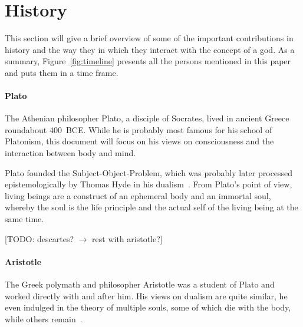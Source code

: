 \section{History}
\label{sec:History}

\begin{figure*}
    \caption[The Timeline]{Timeline of the presented persons. Those grayed out are left as a reference for other mentions in this document~\cite{wikimedia2021}. Rounded rectangles ( and ) denote the full life span of the respective person.}
    \label{fig:timeline}
\end{figure*}

This section will give a brief overview of some of the important contributions in history and the way they in which they interact with the concept of a god.
As a summary, Figure~\ref{fig:timeline} presents all the persons mentioned in this paper and puts them in a time frame.

\paragraph{Plato}
The Athenian philosopher Plato, a disciple of Socrates, lived in ancient Greece roundabout 400~BCE.
While he is probably most famous for his school of Platonism, this document will focus on his views on consciousness and the interaction between body and mind.

Plato founded the Subject-Object-Problem, which was probably later processed epistemologically by Thomas Hyde in his dualism~\cite{plato360}.
From Plato's point of view, living beings are a construct of an ephemeral body and an immortal soul, whereby the soul is the life principle and the actual self of the living being at the same time.

[TODO: descartes? $\to$ rest with aristotle?]

\paragraph{Aristotle}
The Greek polymath and philosopher Aristotle was a student of Plato and worked directly with and after him.
His views on dualism are quite similar, he even indulged in the theory of multiple souls, some of which die with the body, while others remain~\cite{aristotle350,hicks2015aristotle}.

